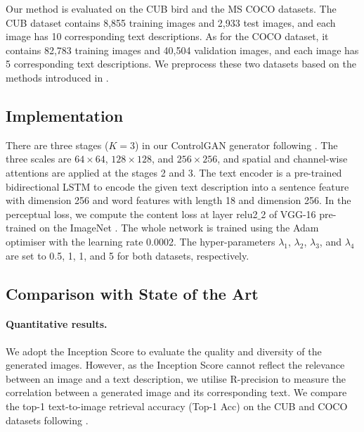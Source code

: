 Our method is evaluated on the CUB bird \citep{wah2011caltech} and the MS COCO \citep{lin2014microsoft} datasets. The CUB dataset contains 8,855 training images and 2,933 test images, and each image has 10 corresponding text descriptions. As for the COCO dataset, it contains 82,783 training images and 40,504 validation images, and each image has 5 corresponding text descriptions. We preprocess these two datasets based on the methods introduced in \cite{zhang2017stackgan}.

\subsection{Implementation}

There are three stages ($K=3$) in our ControlGAN generator following \cite{xu2018attngan}. The three scales are $64 \times 64$, $128 \times 128$, and $256 \times 256$, and spatial and channel-wise attentions {are applied at the stages 2 and 3}. The text encoder is a pre-trained bidirectional LSTM \cite{schuster1997bidirectional} to encode the given text description into a sentence feature with dimension 256 and word features with length 18 and dimension 256. In the perceptual loss, we compute the content loss at layer relu2$\_$2 of VGG-16 \cite{simonyan2014very} pre-trained on the ImageNet \cite{russakovsky2015imagenet}. The whole network is trained using the Adam optimiser \cite{kingma2014adam} with the learning rate 0.0002. The hyper-parameters $\lambda_{1}$, $\lambda_{2}$, $\lambda_{3}$, and $\lambda_{4}$ are set to 0.5, 1, 1, and 5 for both datasets, respectively. 

\subsection{Comparison with State of the Art}

\paragraph{Quantitative results.} We adopt the Inception Score \cite{salimans2016improved} to evaluate the quality and diversity of the generated images. However, as the Inception Score cannot reflect the relevance between an image and a text description, we utilise R-precision \cite{xu2018attngan} to measure the correlation between a generated image and its corresponding text. We compare the top-1 text-to-image retrieval accuracy (Top-1 Acc) on the CUB and COCO datasets following \cite{nam2018text}.

